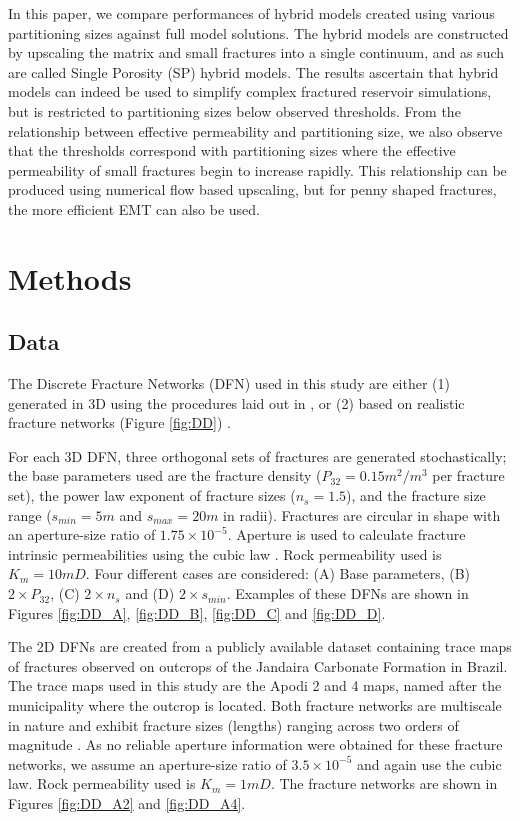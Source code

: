 \documentclass[a4paper]{article}
\begin{document}
In this paper, we compare performances of hybrid models created using various partitioning sizes against full model solutions. The hybrid models are constructed by upscaling the matrix and small fractures into a single continuum, and as such are called Single Porosity (SP) hybrid models. The results ascertain that hybrid models can indeed be used to simplify complex fractured reservoir simulations, but is restricted to partitioning sizes below observed thresholds. From the relationship between effective permeability and partitioning size, we also observe that the thresholds correspond with partitioning sizes where the effective permeability of small fractures begin to increase rapidly. This relationship can be produced using numerical flow based upscaling, but for penny shaped fractures, the more efficient EMT can also be used.

\section{Methods}

\subsection{Data}
The Discrete Fracture Networks (DFN) used in this study are either (1) generated in 3D using the procedures laid out in \citet{Priest1993}, or (2) based on realistic fracture networks (Figure \ref{fig:DD}) \citep{Bisdom2017}.

For each 3D DFN, three orthogonal sets of fractures are generated stochastically; the base parameters used are the fracture density ($P_{32}=0.15m^2/m^3$ per fracture set), the power law exponent of fracture sizes ($n_s=1.5$), and the fracture size range ($s_{min}=5m$ and $s_{max}=20m$ in radii). Fractures are circular in shape with an aperture-size ratio of $1.75\times 10^{-5}$. Aperture is used to calculate fracture intrinsic permeabilities using the cubic law \citep{Witherspoon1980}. Rock permeability used is $K_m=10mD$. Four different cases are considered: (A) Base parameters, (B) $2\times P_{32}$, (C) $2\times n_s$ and (D) $2\times s_{min}$. Examples of these DFNs are shown in Figures \ref{fig:DD_A}, \ref{fig:DD_B}, \ref{fig:DD_C} and \ref{fig:DD_D}.

The 2D DFNs are created from a publicly available dataset containing trace maps of fractures observed on outcrops of the Jandaira Carbonate Formation in Brazil. The trace maps used in this study are the Apodi 2 and 4 maps, named after the municipality where the outcrop is located. Both fracture networks are multiscale in nature and exhibit fracture sizes (lengths) ranging across two orders of magnitude \citep{Bisdom2017}. As no reliable aperture information were obtained for these fracture networks, we assume an aperture-size ratio of $3.5\times 10^{-5}$ and again use the cubic law. Rock permeability used is $K_m=1mD$. The fracture networks are shown in Figures \ref{fig:DD_A2} and \ref{fig:DD_A4}.
\end{document}
